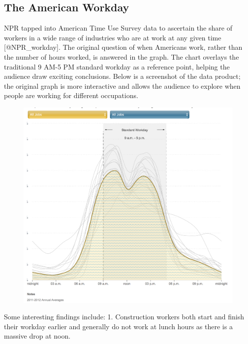 \documentclass[]{book}
\theoremstyle{definition}
\theoremstyle{definition}
\theoremstyle{definition}
\theoremstyle{remark}
\begin{document}
\subsection{The American Workday}\label{the-american-workday}

NPR tapped into American Time Use Survey data to ascertain the share of
workers in a wide range of industries who are at work at any given time
{[}@NPR\_workday{]}. The original question of when Americans work,
rather than the number of hours worked, is answered in the graph. The
chart overlays the traditional 9 AM-5 PM standard workday as a reference
point, helping the audience draw exciting conclusions. Below is a
screenshot of the data product; the original graph is more interactive
and allows the audience to explore when people are working for different
occupations.

\begin{figure}
\centering
\includegraphics{images/npr_workday.png}
\caption{}
\end{figure}

Some interesting findings include: 1. Construction workers both start
and finish their workday earlier and generally do not work at lunch
hours as there is a massive drop at noon.
\end{document}
